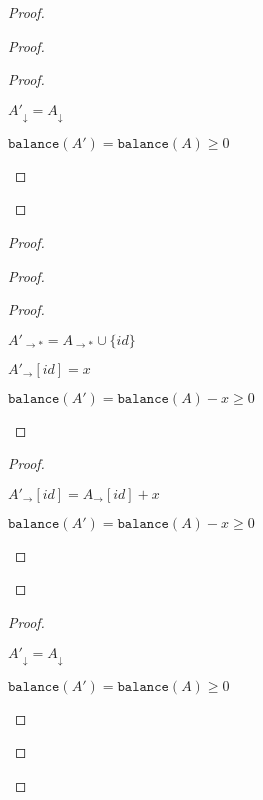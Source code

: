 \documentclass[9pt]{article}   	%
\begin{document}
\begin{proof}
\begin{proof}
		\begin{proof}
			\begin{pfenum}
				\item $A'_\downarrow = A_\downarrow$
				\item $\texttt{balance}(A') = \texttt{balance}(A) \geq 0$
			\end{pfenum}
		\end{proof}		
	\end{proof}
	
	\begin{proof}
		\begin{proof}
			\begin{proof}
				\begin{pfenum}
					\item $A'_{\rightarrow *} = A_{\rightarrow *} \cup \{ \textit{id} \}$
					\item $A'_\rightarrow [\textit{id}] = x$
					\item $\texttt{balance}(A') = \texttt{balance}(A) - x \geq 0$
				\end{pfenum}
			\end{proof}
			
			\begin{proof}
				\begin{pfenum}
					\item $A'_\rightarrow [\textit{id}] = A_\rightarrow [\textit{id}] + x$
					\item $\texttt{balance}(A') = \texttt{balance}(A) - x \geq 0$
				\end{pfenum}
			\end{proof}
		\end{proof}
		
		\begin{proof}
			\begin{pfenum}
				\item $A'_\downarrow = A_\downarrow$
				\item $\texttt{balance}(A') = \texttt{balance}(A) \geq 0$
			\end{pfenum}
		\end{proof}		
	\end{proof}
	

\end{proof}
\end{document}

